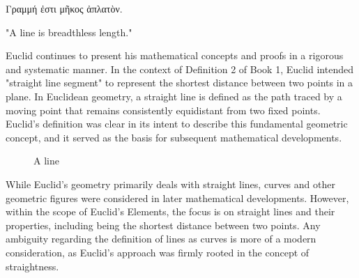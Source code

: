 
\begin{defin}
\textgreek{Γραμμή ἐστι μῆκος ἀπλατὸν.}

"A line is breadthless length."
\end{defin}

Euclid continues to present his mathematical concepts and proofs in a rigorous and systematic manner. In the context of Definition 2 of Book 1, Euclid intended "straight line segment" to represent the shortest distance between two points in a plane. In Euclidean geometry, a straight line is defined as the path traced by a moving point that remains consistently equidistant from two fixed points. Euclid's definition was clear in its intent to describe this fundamental geometric concept, and it served as the basis for subsequent mathematical developments.

\fs

\begin{figure}[H]
\begin{centering}
	\caption{A line}
\end{centering}
\end{figure}

While Euclid's geometry primarily deals with straight lines, curves and other geometric figures were considered in later mathematical developments. However, within the scope of Euclid's Elements, the focus is on straight lines and their properties, including being the shortest distance between two points. Any ambiguity regarding the definition of lines as curves is more of a modern consideration, as Euclid's approach was firmly rooted in the concept of straightness.


\clearpage